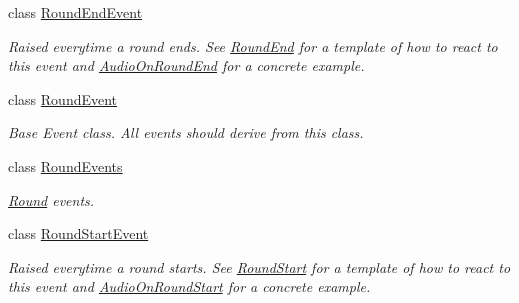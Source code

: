 \begin{DoxyCompactItemize}
class \hyperlink{class_round_manager_1_1_events_1_1_round_end_event}{Round\+End\+Event}
\begin{DoxyCompactList}\small\item\em Raised everytime a round ends. See \hyperlink{class_round_manager_1_1_round_end}{Round\+End} for a template of how to react to this event and \hyperlink{class_round_manager_1_1_audio_on_round_end}{Audio\+On\+Round\+End} for a concrete example. \end{DoxyCompactList}\item 
class \hyperlink{class_round_manager_1_1_events_1_1_round_event}{Round\+Event}
\begin{DoxyCompactList}\small\item\em Base Event class. All events should derive from this class. \end{DoxyCompactList}\item 
class \hyperlink{class_round_manager_1_1_events_1_1_round_events}{Round\+Events}
\begin{DoxyCompactList}\small\item\em \hyperlink{class_round_manager_1_1_round}{Round} events. \end{DoxyCompactList}\item 
class \hyperlink{class_round_manager_1_1_events_1_1_round_start_event}{Round\+Start\+Event}
\begin{DoxyCompactList}\small\item\em Raised everytime a round starts. See \hyperlink{class_round_manager_1_1_round_start}{Round\+Start} for a template of how to react to this event and \hyperlink{class_round_manager_1_1_audio_on_round_start}{Audio\+On\+Round\+Start} for a concrete example. \end{DoxyCompactList}\end{DoxyCompactItemize}
